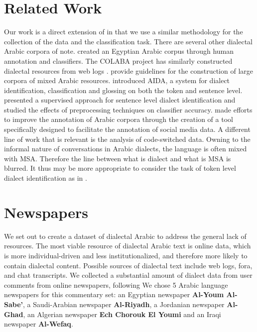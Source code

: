 \documentclass[10pt, a4paper]{article}
\begin{document}
\section{Related Work}\label{sec:related}
Our work is a direct extension of \cite{zaidan2011arabic} in that we
use a similar methodology for the collection of the data and the
classification task. There are several other dialectal Arabic corpora
of note.  created an Egyptian Arabic corpus through
human annotation and classifiers.  The COLABA project has similarly
constructed dialectal resources from web logs
\cite{diab2010colaba}.  provide
guidelines for the construction of large corpora of mixed Arabic
resources.  introduced AIDA, a system for
dialect identification, classification and glossing on both the token
and sentence level.  presented a
supervised approach for sentence level dialect identification and
studied the effects of preprocessing techniques on classifier
accuracy.  made efforts to improve the
annotation of Arabic corpora through the creation of a tool specifically
designed to facilitate the annotation of social media data. A different
line of work that is relevant is the analysis of code-switched
data. Owning to the informal nature of conversations in Arabic
dialects, the language is often mixed with MSA. Therefore the line
between what is dialect and what is MSA is
blurred. It thus may be more appropriate to consider the task of token level
dialect identification as in .

\section{Newspapers}\label{sec:newspaper}
We set out to create a dataset of dialectal Arabic to address the general
lack of resources. The most viable resource of dialectal Arabic text is online
data, which is more individual-driven and less institutionalized, and
therefore more likely to contain dialectal content. Possible sources
of dialectal text include web logs, fora, and chat transcripts.
 We collected
a substantial amount of dialect data from user comments from online
newspapers, following  We chose 5 Arabic
language newspapers for this commentary set: an Egyptian newspaper
\textbf{Al-Youm Al-Sabe'}, a Saudi-Arabian newspaper
\textbf{Al-Riyadh}, a Jordanian newspaper \textbf{Al-Ghad}, an
Algerian newspaper \textbf{Ech Chorouk El Youmi} and an Iraqi
newspaper \textbf{Al-Wefaq}.
\end{document}
